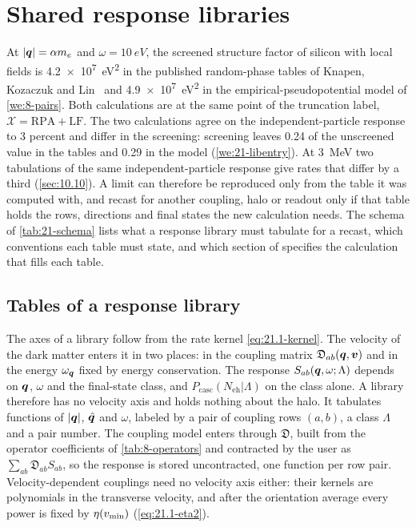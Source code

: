 \section{Shared response libraries}\label{sec:21.6}

At $|\bm{q}| = \alpha m_e$ and $\omega = \SI{10}{eV}$, the screened structure factor of silicon with local fields is \SI{4.2e7}{eV^2} in the published random-phase tables of Knapen, Kozaczuk and Lin~\cite{knapen2021dark} and \SI{4.9e7}{eV^2} in the empirical-pseudopotential model of \cref{we:8-pairs}. Both calculations are at the same point of the truncation label, $\mathcal{X} = \mathrm{RPA + LF}$. The two calculations agree on the independent-particle response to 3 percent and differ in the screening: screening leaves 0.24 of the unscreened value in the tables and 0.29 in the model (\cref{we:21-libentry}). At \SI{3}{MeV} two tabulations of the same independent-particle response give rates that differ by a third (\cref{sec:10.10}). A limit can therefore be reproduced only from the table it was computed with, and recast for another coupling, halo or readout only if that table holds the rows, directions and final states the new calculation needs. The schema of \cref{tab:21-schema} lists what a response library must tabulate for a recast, which conventions each table must state, and which section of  specifies the calculation that fills each table.

\subsection{Tables of a response library}\label{sec:21.6-tables}

The axes of a library follow from the rate kernel \cref{eq:21.1-kernel}. The velocity of the dark matter enters it in two places: in the coupling matrix $\mathfrak{D}_{ab}(\bm{q},\bm{v})$ and in the energy $\omega_{\bm{q}}$ fixed by energy conservation. The response $S_{ab}(\bm{q},\omega;\Lambda)$ depends on $\bm{q}$, $\omega$ and the final-state class, and $P_{\mathrm{casc}}(N_{\mathrm{eh}}|\Lambda)$ on the class alone. A library therefore has no velocity axis and holds nothing about the halo. It tabulates functions of $|\bm{q}|$, $\hat{\bm{q}}$ and $\omega$, labeled by a pair of coupling rows $(a,b)$, a class $\Lambda$ and a pair number. The coupling model enters through $\mathfrak{D}$, built from the operator coefficients of \cref{tab:8-operators} and contracted by the user as $\sum_{ab}\mathfrak{D}_{ab}S_{ab}$, so the response is stored uncontracted, one function per row pair. Velocity-dependent couplings need no velocity axis either: their kernels are polynomials in the transverse velocity, and after the orientation average every power is fixed by $\eta(v_{\mathrm{min}})$ (\cref{eq:21.1-eta2}).

